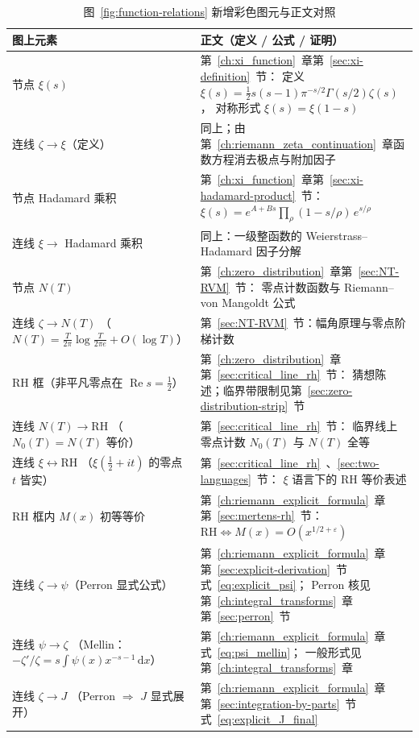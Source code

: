 \begin{table}[htbp]
\centering
\caption{图~\ref{fig:function-relations} 新增彩色图元与正文对照}
\label{tab:spectrum-stage16-guide}
\small
\renewcommand{\arraystretch}{1.35}
\begin{tabular}{@{}p{4.9cm}p{8.3cm}@{}}
\toprule
\textbf{图上元素} & \textbf{正文（定义 / 公式 / 证明）} \\
\midrule
节点 $\xi(s)$ &
  第~\ref{ch:xi_function}~章第~\ref{sec:xi-definition}~节：
  定义 $\xi(s)=\frac12 s(s-1)\pi^{-s/2}\Gamma(s/2)\zeta(s)$，
  对称形式 $\xi(s)=\xi(1-s)$ \\
连线 $\zeta\to\xi$（定义） &
  同上；由第~\ref{ch:riemann_zeta_continuation}~章函数方程消去极点与附加因子 \\
节点 Hadamard 乘积 &
  第~\ref{ch:xi_function}~章第~\ref{sec:xi-hadamard-product}~节：
  $\xi(s)=e^{A+Bs}\prod_{\rho}(1-s/\rho)\,e^{s/\rho}$ \\
连线 $\xi\to$ Hadamard 乘积 &
  同上：一级整函数的 Weierstrass--Hadamard 因子分解 \\
节点 $N(T)$ &
  第~\ref{ch:zero_distribution}~章第~\ref{sec:NT-RVM}~节：
  零点计数函数与 Riemann--von Mangoldt 公式 \\
连线 $\zeta\to N(T)$
  （$N(T)=\frac{T}{2\pi}\log\frac{T}{2\pi e}+O(\log T)$） &
  第~\ref{sec:NT-RVM}~节：幅角原理与零点阶梯计数 \\
RH 框（非平凡零点在 $\operatorname{Re}s=\frac12$） &
  第~\ref{ch:zero_distribution}~章第~\ref{sec:critical_line_rh}~节：
  猜想陈述；临界带限制见第~\ref{sec:zero-distribution-strip}~节 \\
连线 $N(T)\to\mathrm{RH}$
  （$N_0(T)=N(T)$ 等价） &
  第~\ref{sec:critical_line_rh}~节：
  临界线上零点计数 $N_0(T)$ 与 $N(T)$ 全等 \\
连线 $\xi\leftrightarrow\mathrm{RH}$
  （$\xi(\frac12+it)$ 的零点 $t$ 皆实） &
  第~\ref{sec:critical_line_rh}~、\ref{sec:two-languages}~节：
  $\xi$ 语言下的 RH 等价表述 \\
RH 框内 $M(x)$ 初等等价 &
  第~\ref{ch:riemann_explicit_formula}~章第~\ref{sec:mertens-rh}~节：
  $\mathrm{RH}\iff M(x)=O(x^{1/2+\varepsilon})$ \\
\midrule
连线 $\zeta\to\psi$（Perron 显式公式） &
  第~\ref{ch:riemann_explicit_formula}~章第~\ref{sec:explicit-derivation}~节式~\eqref{eq:explicit_psi}；
  Perron 核见第~\ref{ch:integral_transforms}~章第~\ref{sec:perron}~节 \\
连线 $\psi\to\zeta$
  （Mellin：$-\zeta'/\zeta=s\int\psi(x)x^{-s-1}\,\mathrm{d}x$） &
  第~\ref{ch:riemann_explicit_formula}~章式~\eqref{eq:psi_mellin}；
  一般形式见第~\ref{ch:integral_transforms}~章 \\
连线 $\zeta\to J$
  （Perron $\Rightarrow$ $J$ 显式展开） &
  第~\ref{ch:riemann_explicit_formula}~章第~\ref{sec:integration-by-parts}~节式~\eqref{eq:explicit_J_final} \\
\bottomrule
\end{tabular}
\end{table}

